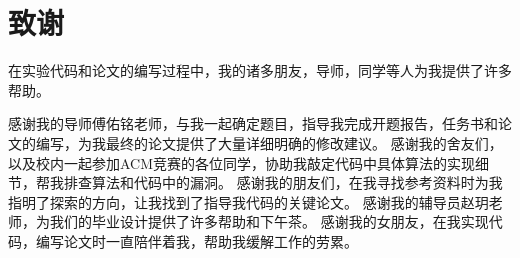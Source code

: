 
\clearpage
{}
{}
\chapter*{致谢}
在实验代码和论文的编写过程中，我的诸多朋友，导师，同学等人为我提供了许多帮助。

感谢我的导师傅佑铭老师，与我一起确定题目，指导我完成开题报告，任务书和论文的编写，为我最终的论文提供了大量详细明确的修改建议。%
感谢我的舍友们，以及校内一起参加ACM竞赛的各位同学，协助我敲定代码中具体算法的实现细节，帮我排查算法和代码中的漏洞。
感谢我的朋友们，在我寻找参考资料时为我指明了探索的方向，让我找到了指导我代码的关键论文。
感谢我的辅导员赵玥老师，为我们的毕业设计提供了许多帮助和下午茶。
感谢我的女朋友，在我实现代码，编写论文时一直陪伴着我，帮助我缓解工作的劳累。

